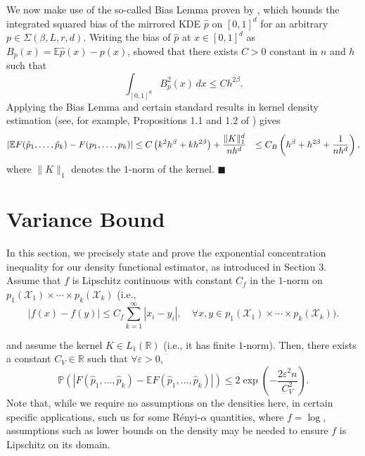 \documentclass{article} %
\renewcommand{\qed}{\quad \ensuremath{\blacksquare}}    %
\newcommand{\R}{\mathbb{R}}                         %
\newcommand{\e}{\varepsilon}                        %
\newcommand{\X}{\mathcal{X}}                        %
\newcommand{\E}{\mathbb{E}}                         %
\newcommand{\pr}{\mathbb{P}}                        %
\begin{document}
We now make use of the so-called Bias Lemma proven by
\citep{singh14exponential}, which bounds the integrated squared bias of the
mirrored KDE $\hat p$ on $[0,1]^d$ for an arbitrary
$p \in \Sigma(\beta,L,r,d)$. Writing the bias of $\hat p$ at $x \in [0,1]^d$ as
$B_p(x) = \E\hat p(x) - p(x)$, \citep{singh14exponential} showed that there
exists $C > 0$ constant in $n$ and $h$ such that
\begin{equation}
\int_{[0,1]^d} B_p^2(x) \, dx \leq Ch^{2\beta}.
\label{ineq:bias_lemma}
\end{equation}
Applying the Bias Lemma and certain standard results in kernel density
estimation (see, for example, Propositions 1.1 and 1.2 of
\citep{Tsybakov:2008:INE:1522486}) gives
\begin{align}
\notag
|\E F(\hat p_1,\dots,\hat p_k) - F(p_1,\dots,p_k)|
 &  \leq C \left( k^2h^\beta + kh^{2\beta} \right) + \frac{\|K\|_1^d}{nh^d}
 &  \leq C_B \left( h^\beta + h^{2\beta} + \frac{1}{nh^d} \right),
\end{align}
where $\|K\|_1$ denotes the $1$-norm of the kernel. \qed

\section{Variance Bound}
In this section, we precisely state and prove the exponential concentration
inequality for our density functional estimator, as introduced in Section 3.
Assume that $f$ is Lipschitz continuous with constant $C_f$ in the $1$-norm
on $p_1(\X_1) \times\cdots\times p_k(\X_k)$ (i.e.,
\begin{equation}
|f(x) - f(y)| \leq C_f\sum_{k = 1}^\infty |x_i - y_i|,
    \quad \forall x,y \in p_1(\X_1) \times\cdots\times p_k(\X_k)).
\label{ineq:lip_cond}
\end{equation}

and assume the kernel $K \in L_1(\R)$ (i.e., it has finite $1$-norm). Then,
there exists a constant $C_V \in \R$ such that $\forall \e > 0$,
\[\pr\left(|F(\hat p_1,\dots,\hat p_k) - \E F(\hat p_1,\dots,\hat p_k)|\right)
    \leq 2\exp \left( -\frac{2\e^2n}{C_V^2} \right).\]
Note that, while we require no assumptions on the densities here, in certain
specific applications, such us for some R\'enyi-$\alpha$ quantities, where
$f = \log$, assumptions such as lower bounds on the density may be needed to
ensure $f$ is Lipschitz on its domain.
\end{document}
